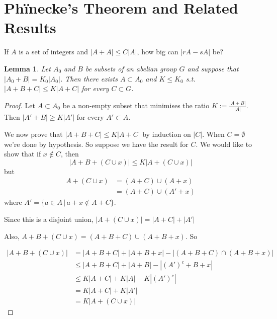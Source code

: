 \documentclass[a4paper]{article}
\newtheorem{lemma}{Lemma}
\newcommand*\abs[1]{\left|#1\right|}
\begin{document}
\section{Ph\"inecke's Theorem and Related Results}
\setcounter{lemma}{0}
If $A$ is a set of integers and $\abs{A+A} \leq C\abs{A}$, how big can $\abs{rA-sA}$ be?

\begin{lemma}
	Let $A_0$ and $B$ be subsets of an abelian group $G$ and suppose that $\abs{A_0+B} = K_0\abs{A_0}$.
	Then there exists $A \subset A_0$ and $K \leq K_0$ s.t. $\abs{A+B+C} \leq K\abs{A+C}$ for every $C \subset G$.
\end{lemma}
\begin{proof}
	Let $A \subset A_0$ be a non-empty subset that minimises the ratio $K := \frac{\abs{A+B}}{\abs{A}}$.
	Then $\abs{A'+B} \geq K\abs{A'}$ for every $A' \subset A$.
	
	We now prove that $\abs{A+B+C} \leq K\abs{A+C}$ by induction on $\abs{C}$.
	When $C = \emptyset$ we're done by hypothesis.
	So suppose we have the result for $C$.
	We would like to show that if $x \not\in C$, then $$\abs{A+B+(C \cup x)} \leq K\abs{A+(C \cup x)}$$
	but
	\begin{align*}
		A+(C \cup x) &= (A+C) \cup (A + x) \\
		&= (A+C) \cup (A'+ x)
	\end{align*}
	where $A' = \{a \in A \,|\, a+ x \not\in A+C \}$.
	
	Since this is a disjoint union,
	$\abs{A+(C \cup x)} = \abs{A+C} + \abs{A'}$
	
	Also, $A+B+(C \cup x) = (A+B+C) \cup (A+B+x)$. So
	
	\begin{align*}
		\abs{A+B+(C \cup x)} &= \abs{A+B+C} + \abs{A+B+x} - \abs{(A+B+C) \cap (A+B+x)} \\
		&\leq \abs{A+B+C} + \abs{A+B} - \abs{(A')^c + B +x} \\
		&\leq K\abs{A+C} + K\abs{A} - K\abs{(A')^c} \\
		&= K\abs{A+C}+K\abs{A'} \\
		&= K\abs{A+(C \cup x)}
	\end{align*}
\end{proof}
\end{document}
